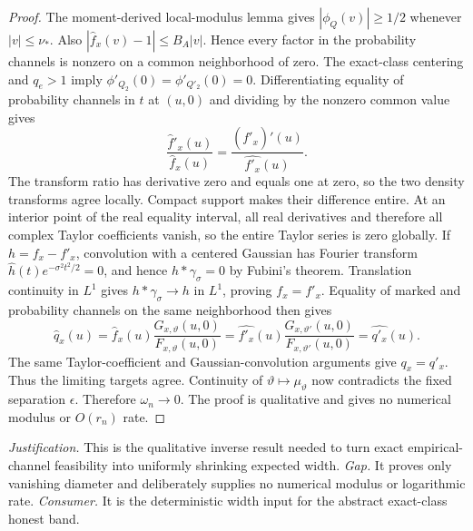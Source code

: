 \documentclass{article}
\begin{document}
\begin{proof}
The moment-derived local-modulus lemma gives \(|\phi_Q(v)|\ge1/2\) whenever \(|v|\le\nu_*\). Also \(|\widehat f_x(v)-1|\le B_A|v|\). Hence every factor in the probability channels is nonzero on a common neighborhood of zero. The exact-class centering and \(q_e>1\) imply \(\phi'_{Q_2}(0)=\phi'_{Q'_2}(0)=0\). Differentiating equality of probability channels in \(t\) at \((u,0)\) and dividing by the nonzero common value gives
\[
 \frac{\widehat f'_x(u)}{\widehat f_x(u)}
 =\frac{(\widehat{f'_x})'(u)}{\widehat{f'_x}(u)}.
\]
The transform ratio has derivative zero and equals one at zero, so the two density transforms agree locally. Compact support makes their difference entire. At an interior point of the real equality interval, all real derivatives and therefore all complex Taylor coefficients vanish, so the entire Taylor series is zero globally. If \(h=f_x-f'_x\), convolution with a centered Gaussian has Fourier transform \(\widehat h(t)e^{-\sigma^2t^2/2}=0\), and hence \(h*\gamma_\sigma=0\) by Fubini's theorem. Translation continuity in \(L^1\) gives \(h*\gamma_\sigma\to h\) in \(L^1\), proving \(f_x=f'_x\). Equality of marked and probability channels on the same neighborhood then gives
\[
 \widehat q_x(u)=\widehat f_x(u)\frac{G_{x,\vartheta}(u,0)}{F_{x,\vartheta}(u,0)}
 =\widehat{f'_x}(u)\frac{G_{x,\vartheta'}(u,0)}{F_{x,\vartheta'}(u,0)}
 =\widehat{q'_x}(u).
\]
The same Taylor-coefficient and Gaussian-convolution arguments give \(q_x=q'_x\). Thus the limiting targets agree. Continuity of \(\vartheta\mapsto\mu_\vartheta\) now contradicts the fixed separation \(\epsilon\). Therefore \(\omega_n\to0\). The proof is qualitative and gives no numerical modulus or \(O(r_n)\) rate.
\end{proof}
\par\smallskip\noindent \textit{Justification.} This is the qualitative inverse result needed to turn exact empirical-channel feasibility into uniformly shrinking expected width. \textit{Gap.} It proves only vanishing diameter and deliberately supplies no numerical modulus or logarithmic rate. \textit{Consumer.} It is the deterministic width input for the abstract exact-class honest band.
\end{document}
